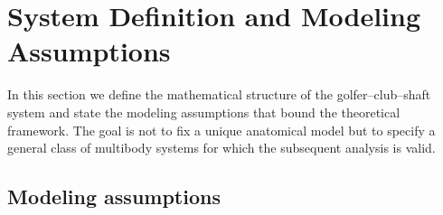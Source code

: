 \documentclass[12pt]{article}
\begin{document}
\section{System Definition and Modeling Assumptions}
\label{sec:system}

In this section we define the mathematical structure of the golfer--club--shaft system and state the modeling assumptions that bound the theoretical framework. The goal is not to fix a unique anatomical model but to specify a general class of multibody systems for which the subsequent analysis is valid.

\subsection{Modeling assumptions}
\label{subsec:assumptions}
\end{document}
